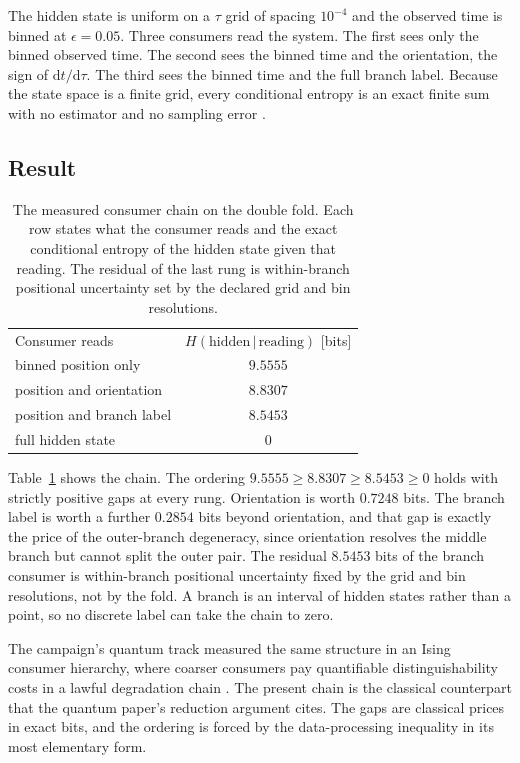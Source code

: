 \documentclass[aps,pre,reprint,nofootinbib]{revtex4-2}
\newcommand{\dd}{\mathrm{d}}
\begin{document}
The hidden state is uniform on a $\tau$ grid of spacing $10^{-4}$ and the
observed time is binned at $\epsilon = 0.05$.  Three consumers read the
system.  The first sees only the binned observed time.  The second sees
the binned time and the orientation, the sign of $\dd t/\dd\tau$.  The
third sees the binned time and the full branch label.  Because the state
space is a finite grid, every conditional entropy is an exact finite sum
with no estimator and no sampling error \cite{CoverThomas2006}.

\subsection{Result}

\begin{table}[t]
\caption{The measured consumer chain on the double fold.  Each row states
what the consumer reads and the exact conditional entropy of the hidden
state given that reading.  The residual of the last rung is within-branch
positional uncertainty set by the declared grid and bin resolutions.}
\label{tab:pe5}
\begin{ruledtabular}
\begin{tabular}{lc}
Consumer reads & $H(\text{hidden}\,|\,\text{reading})$ [bits] \\
\colrule
binned position only          & $9.5555$ \\
position and orientation      & $8.8307$ \\
position and branch label     & $8.5453$ \\
full hidden state             & $0$ \\
\end{tabular}
\end{ruledtabular}
\end{table}

Table~\ref{tab:pe5} shows the chain.  The ordering
$9.5555 \ge 8.8307 \ge 8.5453 \ge 0$ holds with strictly positive gaps at
every rung.  Orientation is worth $0.7248$ bits.  The branch label is
worth a further $0.2854$ bits beyond orientation, and that gap is exactly
the price of the outer-branch degeneracy, since orientation resolves the
middle branch but cannot split the outer pair.  The residual $8.5453$ bits
of the branch consumer is within-branch positional uncertainty fixed by
the grid and bin resolutions, not by the fold.  A branch is an interval of
hidden states rather than a point, so no discrete label can take the chain
to zero.

The campaign's quantum track measured the same structure in an Ising
consumer hierarchy, where coarser consumers pay quantifiable
distinguishability costs in a lawful degradation chain
\cite{QuantumPaper}.  The present chain is the classical counterpart that
the quantum paper's reduction argument cites.  The gaps are classical
prices in exact bits, and the ordering is forced by the data-processing
inequality in its most elementary form.
\end{document}
